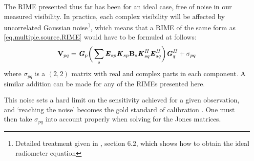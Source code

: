 \pg
The RIME presented thus far has been for an ideal case, free of noise in our measured visibility. In practice, each complex visibility will be affected by uncorrelated Gaussian noise\footnote{Detailed treatment given in , section 6.2, which shows how to obtain the ideal radiometer equation}, which means that a RIME of the same form as \cref{eq.multiple.source.RIME} would have to be formuled at follows:
\begin{equation}
\textbf{V}_{pq} = \textbf{\emph{G}}_p \bigg( \sum_s \textbf{\emph{E}}_{sp} \textbf{\emph{K}}_{sp} \textbf{B}_{s} \textbf{\emph{K}}_{sq}^H \textbf{\emph{E}}_{sq}^H \bigg) \textbf{\emph{G}}_q^H + \sigma_{pq}
\end{equation}
where $\sigma_{pq}$ is a $(2,2)$ matrix with real and complex parts in each component. A similar addition can be made for any of the RIMEs presented here.

\pg
This noise sets a hard limit on the sensitivity achieved for a given observation, and `reaching the noise' becomes the gold standard of calibration . One must then take $\sigma_{pq}$ into account properly when solving for the Jones matrices.



